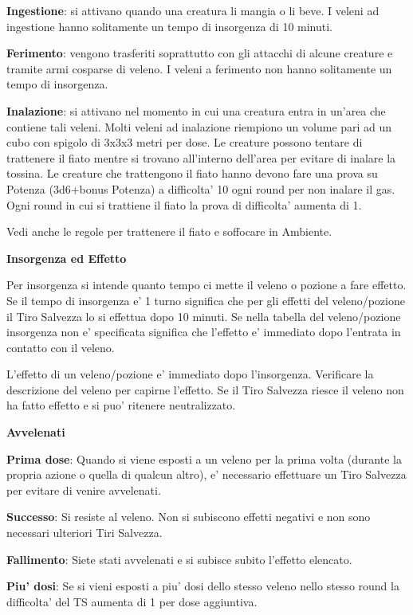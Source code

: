 \documentclass[a4paper,11pt,twoside,openany]{dndbook}
\begin{document}
{\textbf{Ingestione}: si attivano quando una creatura li mangia o li beve. I veleni ad ingestione hanno solitamente un tempo di insorgenza di 10 minuti.

\textbf{Ferimento}: vengono trasferiti soprattutto con gli attacchi di alcune creature e tramite armi cosparse di veleno. I veleni a ferimento non hanno solitamente un tempo di insorgenza. 

\textbf{Inalazione}: si attivano nel momento in cui una creatura entra in un'area che contiene tali veleni. Molti veleni ad inalazione riempiono un volume pari ad un cubo con spigolo di 3x3x3 metri per dose. Le creature possono tentare di trattenere il fiato mentre si trovano all'interno dell'area per evitare di inalare la tossina. Le creature che trattengono il fiato hanno devono fare una prova su Potenza (3d6+bonus Potenza) a difficolta' 10 ogni round per non inalare il gas. Ogni round in cui si trattiene il fiato la prova di difficolta' aumenta di 1.

Vedi anche le regole per trattenere il fiato e soffocare in Ambiente.

\textbf{Insorgenza ed Effetto}

Per insorgenza si intende quanto tempo ci mette il veleno o pozione a fare effetto. Se il tempo di insorgenza e' 1 turno significa che per gli effetti del veleno/pozione il Tiro Salvezza lo si effettua dopo 10 minuti. Se nella tabella del veleno/pozione insorgenza non e' specificata significa che l'effetto e' immediato dopo l'entrata in contatto con il veleno.

L'effetto di un veleno/pozione e' immediato dopo l'insorgenza. Verificare la descrizione del veleno per capirne l'effetto. Se il Tiro Salvezza riesce il veleno non ha fatto effetto e si puo' ritenere neutralizzato. 

\bigskip

\textbf{Avvelenati}

\textbf{Prima dose}: Quando si viene esposti a un veleno per la prima volta (durante la propria azione o quella di qualcun altro), e' necessario effettuare un Tiro Salvezza per evitare di venire avvelenati. 

\textbf{Successo}: Si resiste al veleno. Non si subiscono effetti negativi e non sono necessari ulteriori Tiri Salvezza.

\textbf{Fallimento}: Siete stati avvelenati e si subisce subito l'effetto elencato.

\textbf{Piu' dosi}: Se si vieni esposti a piu' dosi dello stesso veleno nello stesso round la difficolta' del TS aumenta di 1 per dose aggiuntiva.

}
\end{document}

